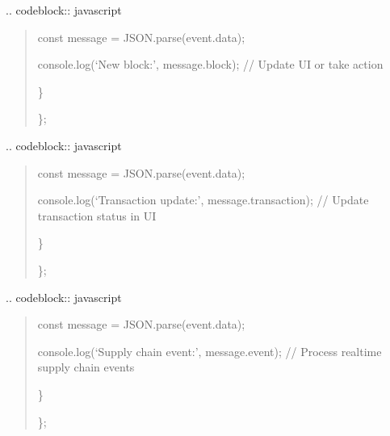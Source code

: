 \documentclass[letterpaper,10pt,english]{sphinxmanual}
\begin{document}
\sphinxAtStartPar
{}
.. code\sphinxhyphen{}block:: javascript
\begin{quote}
\begin{description}
\sphinxAtStartPar
const message = JSON.parse(event.data);
\begin{description}
\sphinxAtStartPar
console.log(‘New block:’, message.block);
// Update UI or take action

\end{description}

\sphinxAtStartPar
\}

\end{description}

\sphinxAtStartPar
\};
\end{quote}

\sphinxAtStartPar
{}
.. code\sphinxhyphen{}block:: javascript
\begin{quote}
\begin{description}
\sphinxAtStartPar
const message = JSON.parse(event.data);
\begin{description}
\sphinxAtStartPar
console.log(‘Transaction update:’, message.transaction);
// Update transaction status in UI

\end{description}

\sphinxAtStartPar
\}

\end{description}

\sphinxAtStartPar
\};
\end{quote}

\sphinxAtStartPar
{}
.. code\sphinxhyphen{}block:: javascript
\begin{quote}
\begin{description}
\sphinxAtStartPar
const message = JSON.parse(event.data);
\begin{description}
\sphinxAtStartPar
console.log(‘Supply chain event:’, message.event);
// Process real\sphinxhyphen{}time supply chain events

\end{description}

\sphinxAtStartPar
\}

\end{description}

\sphinxAtStartPar
\};
\end{quote}
\end{document}

